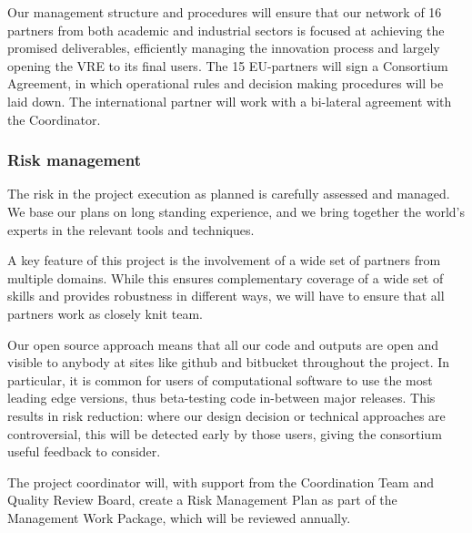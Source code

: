Our management structure and procedures will ensure that our network
of  16 partners from both academic and industrial sectors is focused at
achieving the promised deliverables, efficiently managing the
innovation process and largely opening the VRE to its final users. The
 15 EU-partners will sign a Consortium Agreement, in which operational
rules and decision making procedures will be laid down. The
international partner will work with a bi-lateral agreement with the
Coordinator.







\subsubsection{Risk management}

The risk in the project execution as planned is carefully assessed and
managed. We base our plans on long standing experience, and we bring
together the world's experts in the relevant tools and techniques.

A key feature of this project is the involvement of a wide set of
partners from multiple domains. While this ensures complementary
coverage of a wide set of skills and provides robustness in different
ways, we will have to ensure that all partners work as closely knit
team. 

Our open source approach means that all our code and outputs
are open and visible to anybody at sites like github and bitbucket
throughout the project. In particular, it is common for users of
computational software to use the most leading edge versions, thus
beta-testing code in-between major releases. This results in risk
reduction: where our design decision or technical approaches are
controversial, this will be detected early by those users, giving the
consortium useful feedback to consider.

The project coordinator will, with support from the Coordination Team
and Quality Review Board, create a Risk Management Plan
 as part of the Management Work Package,
which will be reviewed annually.

